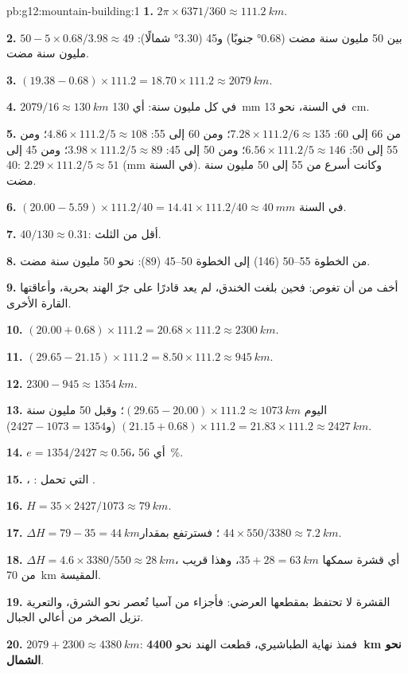 \begin{solution}{pb:g12:mountain-building:1}
\textbf{1.} $2\pi \times 6371/360 \approx \qty{111.2}{km}$.

\textbf{2.} بين 50 مليون سنة مضت (\ang{0.68} جنوبًا) و45 (\ang{3.30} شمالًا):
$50 - 5 \times 0.68/3.98 \approx 49$ مليون سنة مضت.

\textbf{3.} $(19.38 - 0.68) \times 111.2 = 18.70 \times 111.2 \approx
\qty{2079}{km}$.

\textbf{4.} $2079/16 \approx \qty{130}{km}$ في كل مليون سنة: أي \qty{130}{mm}
في السنة، نحو \qty{13}{cm}.

\textbf{5.} من 66 إلى 60: $7.28 \times 111.2/6 \approx 135$؛ ومن 60 إلى 55: $4.86
\times 111.2/5 \approx 108$؛ ومن 55 إلى 50: $6.56 \times 111.2/5 \approx 146$؛ ومن 50
إلى 45: $3.98 \times 111.2/5 \approx 89$؛ ومن 45 إلى 40: $2.29 \times 111.2/5
\approx 51$ (\unit{mm} في السنة). وكانت أسرع من 55 إلى 50 مليون سنة مضت.

\textbf{6.} $(20.00 - 5.59) \times 111.2/40 = 14.41 \times 111.2/40 \approx
\qty{40}{mm}$ في السنة.

\textbf{7.} $40/130 \approx 0.31$: أقل من الثلث.

\textbf{8.} من الخطوة 55--50 (146) إلى الخطوة 50--45 (89): نحو 50
مليون سنة مضت.

\textbf{9.}  أخف من أن تغوص: فحين بلغت
الخندق، لم يعد  قادرًا على جرّ الهند بحرية، وأعاقتها القارة
الأخرى.

\textbf{10.} $(20.00 + 0.68) \times 111.2 = 20.68 \times 111.2 \approx
\qty{2300}{km}$.

\textbf{11.} $(29.65 - 21.15) \times 111.2 = 8.50 \times 111.2 \approx
\qty{945}{km}$.

\textbf{12.} $2300 - 945 \approx \qty{1354}{km}$.

\textbf{13.} اليوم $(29.65 - 20.00) \times 111.2 \approx \qty{1073}{km}$؛
وقبل 50 مليون سنة $(21.15 + 0.68) \times 111.2 = 21.83 \times 111.2
\approx \qty{2427}{km}$ (و$2427 - 1073 = 1354$).

\textbf{14.} $e = 1354/2427 \approx 0.56$، أي \qty{56}{\percent}.

\textbf{15.} ، :  التي تحمل .

\textbf{16.} $H = 35 \times 2427/1073 \approx \qty{79}{km}$.

\textbf{17.} $\Delta H = 79 - 35 = \qty{44}{km}$؛ فسترتفع بمقدار
$44 \times 550/3380 \approx \qty{7.2}{km}$.

\textbf{18.} $\Delta H = 4.6 \times 3380/550 \approx \qty{28}{km}$، أي قشرة
سمكها $35 + 28 = \qty{63}{km}$، وهذا قريب من \qty{70}{km}
المقيسة.

\textbf{19.} القشرة لا تحتفظ بمقطعها العرضي: فأجزاء من آسيا
تُعصر نحو الشرق، والتعرية تزيل الصخر من أعالي
الجبال.

\textbf{20.} $2079 + 2300 \approx \qty{4380}{km}$: فمنذ نهاية
الطباشيري، قطعت الهند نحو \textbf{\qty{4400}{km} نحو الشمال}.
\end{solution}

